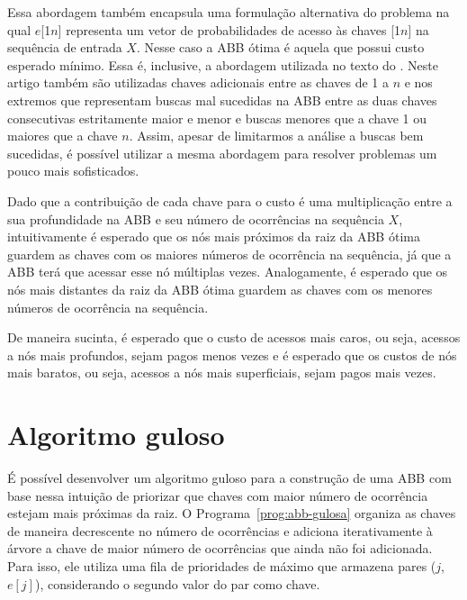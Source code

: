 Essa abordagem também encapsula uma formulação alternativa do problema na qual $e$[1\tdots$n$] representa um vetor de probabilidades de acesso às chaves [1\tdots$n$] na sequência de entrada $X$. Nesse caso a ABB ótima é aquela que possui custo esperado mínimo. Essa é, inclusive, a abordagem utilizada no texto do \cite{knuth}. Neste artigo também são utilizadas chaves adicionais entre as chaves de 1 a $n$ e nos extremos que representam buscas mal sucedidas na ABB entre as duas chaves consecutivas estritamente maior e menor e buscas menores que a chave 1 ou maiores que a chave $n$. Assim, apesar de limitarmos a análise a buscas bem sucedidas, é possível utilizar a mesma abordagem para resolver problemas um pouco mais sofisticados.

Dado que a contribuição de cada chave para o custo é uma multiplicação entre a sua profundidade na ABB e seu número de ocorrências na sequência $X$, intuitivamente é esperado que os nós mais próximos da raiz da ABB ótima guardem as chaves com os maiores números de ocorrência na sequência, já que a ABB terá que acessar esse nó múltiplas vezes. Analogamente, é esperado que os nós mais distantes da raiz da ABB ótima guardem as chaves com os menores números de ocorrência na sequência.

De maneira sucinta, é esperado que o custo de acessos mais caros, ou seja, acessos a nós mais profundos, sejam pagos menos vezes e é esperado que os custos de nós mais baratos, ou seja, acessos a nós mais superficiais, sejam pagos mais vezes.

\section{Algoritmo guloso}

É possível desenvolver um algoritmo guloso para a construção de uma ABB com base nessa intuição de priorizar que chaves com maior número de ocorrência estejam mais próximas da raiz. O Programa~\ref{prog:abb-gulosa} organiza as chaves de maneira decrescente no número de ocorrências e adiciona iterativamente à árvore a chave de maior número de ocorrências que ainda não foi adicionada. Para isso, ele utiliza uma fila de prioridades de máximo que armazena pares ($j$, $e[j]$), considerando o segundo valor do par como chave.

